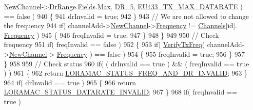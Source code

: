 \begin{DoxyCode}
      \mbox{\hyperlink{structs_channel_add_params_afc31493a105479490228fd896b20b45c}{NewChannel}}->\mbox{\hyperlink{structs_channel_params_ad4d9b041ea740886a05fa8a1d06997a2}{DrRange}}.\mbox{\hyperlink{unionu_dr_range_a5bdb9afc17112f2ae5f9548f0aee964f}{Fields}}.\mbox{\hyperlink{structu_dr_range_1_1s_fields_a5d03c6d792ca60d11ffc7e7a2cb59dd0}{Max}}, \mbox{\hyperlink{group___r_e_g_i_o_n_ga872e12c82020c02a7f70a1c6ed1375df}{DR\_5}}, 
      \mbox{\hyperlink{group___r_e_g_i_o_n_e_u433_gab53c26fec08fdd51e56cb0c4344f3fe9}{EU433\_TX\_MAX\_DATARATE}} ) == \textcolor{keyword}{false} )
940         \{
941             drInvalid = \textcolor{keyword}{true};
942         \}
943         \textcolor{comment}{// We are not allowed to change the frequency}
944         \textcolor{keywordflow}{if}( channelAdd->\mbox{\hyperlink{structs_channel_add_params_afc31493a105479490228fd896b20b45c}{NewChannel}}->\mbox{\hyperlink{structs_channel_params_ade3d190636488dad9a89b19446b7acf1}{Frequency}} != \mbox{\hyperlink{_region_e_u433_8c_a989ac3355f1ed5b534b3940af3deeb14}{Channels}}[\textcolor{keywordtype}{id}].
      \mbox{\hyperlink{structs_channel_params_ade3d190636488dad9a89b19446b7acf1}{Frequency}} )
945         \{
946             freqInvalid = \textcolor{keyword}{true};
947         \}
948     \}
949 
950     \textcolor{comment}{// Check frequency}
951     \textcolor{keywordflow}{if}( freqInvalid == \textcolor{keyword}{false} )
952     \{
953         \textcolor{keywordflow}{if}( \mbox{\hyperlink{_region_e_u433_8c_af6b3cfa164d4105815aaaa55f02d723e}{VerifyTxFreq}}( channelAdd->\mbox{\hyperlink{structs_channel_add_params_afc31493a105479490228fd896b20b45c}{NewChannel}}->
      \mbox{\hyperlink{structs_channel_params_ade3d190636488dad9a89b19446b7acf1}{Frequency}} ) == \textcolor{keyword}{false} )
954         \{
955             freqInvalid = \textcolor{keyword}{true};
956         \}
957     \}
958 
959     \textcolor{comment}{// Check status}
960     \textcolor{keywordflow}{if}( ( drInvalid == \textcolor{keyword}{true} ) && ( freqInvalid == \textcolor{keyword}{true} ) )
961     \{
962         \textcolor{keywordflow}{return} \mbox{\hyperlink{group___l_o_r_a_m_a_c_gga1d18f26b344040b3ec5c3db662919661a163a1a739baee13607068af42f2e9d30}{LORAMAC\_STATUS\_FREQ\_AND\_DR\_INVALID}};
963     \}
964     \textcolor{keywordflow}{if}( drInvalid == \textcolor{keyword}{true} )
965     \{
966         \textcolor{keywordflow}{return} \mbox{\hyperlink{group___l_o_r_a_m_a_c_gga1d18f26b344040b3ec5c3db662919661aa910e51ef7a7cf64c27dd3ffe5eb9d38}{LORAMAC\_STATUS\_DATARATE\_INVALID}};
967     \}
968     \textcolor{keywordflow}{if}( freqInvalid == \textcolor{keyword}{true} )

\end{DoxyCode}
